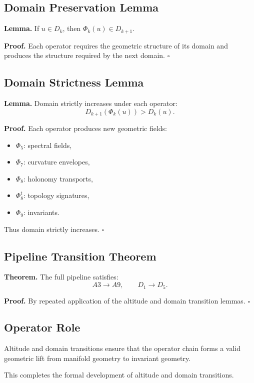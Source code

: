 \subsection{Domain Preservation Lemma}

\textbf{Lemma.}
If $u \in D_k$, then $\Phi_k(u) \in D_{k+1}$.

\textbf{Proof.}
Each operator requires the geometric structure of its domain and produces the
structure required by the next domain. \(\square\)

\subsection{Domain Strictness Lemma}

\textbf{Lemma.}
Domain strictly increases under each operator:
\[
D_{k+1}(\Phi_k(u)) > D_k(u).
\]

\textbf{Proof.}
Each operator produces new geometric fields:

\begin{itemize}
    \item $\Phi_5$: spectral fields,
    \item $\Phi_7$: curvature envelopes,
    \item $\Phi_8$: holonomy transports,
    \item $\Phi_8^t$: topology signatures,
    \item $\Phi_9$: invariants.
\end{itemize}

Thus domain strictly increases. \(\square\)

\subsection{Pipeline Transition Theorem}

\textbf{Theorem.}
The full pipeline satisfies:
\[
A3 \to A9,
\qquad
D_1 \to D_5.
\]

\textbf{Proof.}
By repeated application of the altitude and domain transition lemmas. \(\square\)

\subsection{Operator Role}

Altitude and domain transitions ensure that the operator chain forms a valid
geometric lift from manifold geometry to invariant geometry.

This completes the formal development of altitude and domain transitions.
